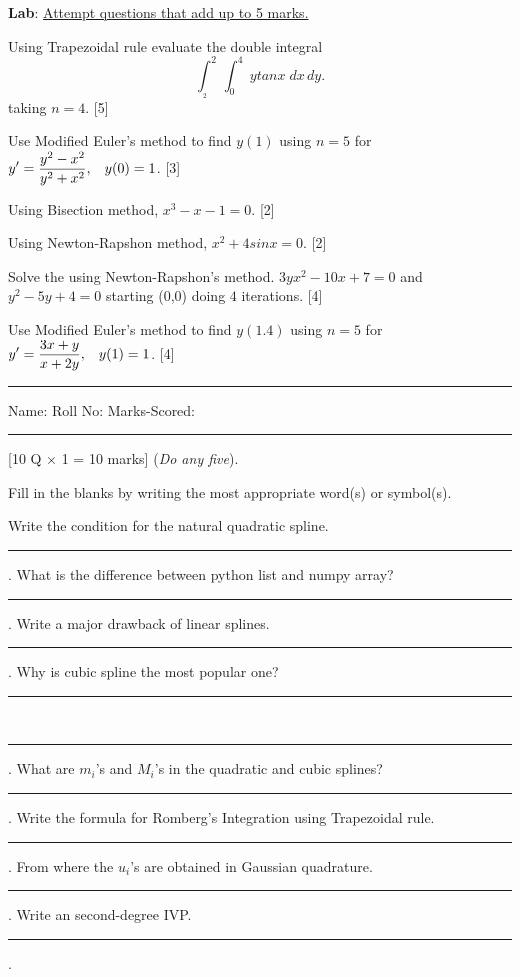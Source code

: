 \documentclass[12pt]{exam}
\begin{document}
 \begin{center}
    \textbf{Lab}: \underline{Attempt questions that add up to 5 marks.}
  \end{center}
\begin{questions}
   \question Using Trapezoidal rule evaluate the double integral $$\int_{_2}^2 \, \int_0^4 \; ytanx \; dx\, dy.$$ taking $n=4$. [5]

   \question Use Modified Euler's method to find $y(1)$ using $n=5$ for $\displaystyle y'=\frac{y^2-x^2}{y^2 + x^2}, \hspace{3mm} y(0)=1$. [3]

   \question Using Bisection method, $x^3-x-1=0$. [2]

 \question Using Newton-Rapshon method, $x^2 + 4sinx=0$. [2]

 \question Solve the using Newton-Rapshon's method. $3yx^2-10x+7=0$ and $y^2-5y+4=0$ starting (0,0) doing $4$ iterations. [4]

 \question Use Modified Euler's method to find $y(1.4)$ using $n=5$ for $\displaystyle y'=\frac{3x+y}{x+2y}, \hspace{3mm} y(1)=1$. [4]
\end{questions}
\newpage

\begin{center}
  \rule{\textwidth}{1pt}
  Name: \hspace{5cm}  Roll No: \hspace{3cm} Marks-Scored:
  \vskip -3mm
\rule{\textwidth}{1pt}
\end{center}
\begin{center}
   [10 Q \(\times\) 1 = 10 marks] (\textit{Do any five}).
\end{center}
Fill in the blanks by writing the most appropriate word(s) or symbol(s).
\begin{questions}
  \question Write the condition for the natural quadratic spline. \rule{7cm}{0.15mm}.
\vspace{2mm}
\question What is the difference between python list and numpy array? \\[1mm]
  \rule{13cm}{0.15mm}.
\vspace{2mm}
  \question Write a major drawback of linear splines. \rule{7cm}{0.15mm}.
\vspace{2mm}
  \question Why is cubic spline the most popular one? \rule{7cm}{0.15mm} \\[1mm]
  \rule{9cm}{0.15mm}.
\vspace{2mm}
  \question What are $m_i$'s and $M_i$'s in the quadratic and cubic splines? \rule{5cm}{0.15mm}.
\vspace{2mm}
  \question Write the formula for Romberg's Integration using Trapezoidal rule. \rule{4cm}{0.15mm}.
\vspace{2mm}
\question From where the $u_i$'s are obtained in Gaussian quadrature. \rule{5cm}{0.15mm}.
\vspace{2mm}
\question Write an second-degree IVP. \rule{9cm}{0.15mm}.
\end{questions}
\end{document}
